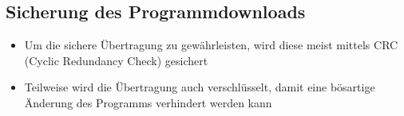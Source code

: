 \subsection{Sicherung des Programmdownloads}
\begin{itemize}
	\item Um die sichere Übertragung zu gewährleisten, wird diese meist mittels CRC (Cyclic Redundancy Check) gesichert
	\item Teilweise wird die Übertragung auch verschlüsselt, damit eine bösartige Änderung des Programms verhindert werden kann	
\end{itemize}